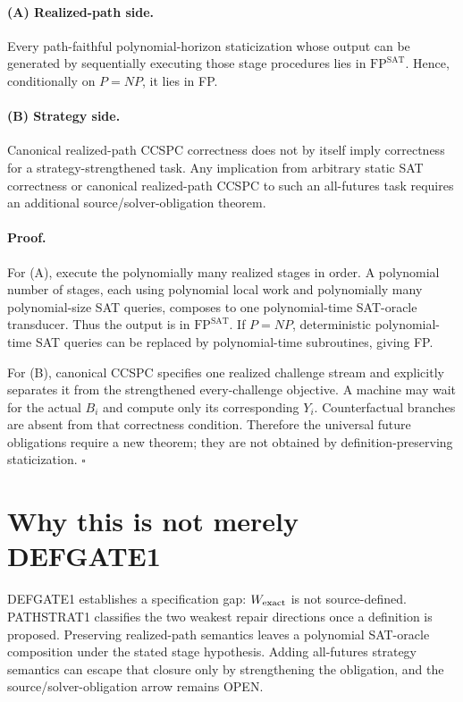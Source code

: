 \documentclass[11pt]{article}
\begin{document}
\paragraph{(A) Realized-path side.}
Every path-faithful polynomial-horizon staticization whose output can be generated by sequentially executing those stage procedures lies in $\mathrm{FP}^{\mathrm{SAT}}$. Hence, conditionally on $P=NP$, it lies in FP.

\paragraph{(B) Strategy side.}
Canonical realized-path CCSPC correctness does not by itself imply correctness for a strategy-strengthened task. Any implication from arbitrary static SAT correctness or canonical realized-path CCSPC to such an all-futures task requires an additional source/solver-obligation theorem.

\paragraph{Proof.}
For (A), execute the polynomially many realized stages in order. A polynomial number of stages, each using polynomial local work and polynomially many polynomial-size SAT queries, composes to one polynomial-time SAT-oracle transducer. Thus the output is in $\mathrm{FP}^{\mathrm{SAT}}$. If $P=NP$, deterministic polynomial-time SAT queries can be replaced by polynomial-time subroutines, giving FP.

For (B), canonical CCSPC specifies one realized challenge stream and explicitly separates it from the strengthened every-challenge objective. A machine may wait for the actual $B_i$ and compute only its corresponding $Y_i$. Counterfactual branches are absent from that correctness condition. Therefore the universal future obligations require a new theorem; they are not obtained by definition-preserving staticization. \(\square\)

\section*{Why this is not merely DEFGATE1}
DEFGATE1 establishes a specification gap: $W_{\rm exact}$ is not source-defined. PATHSTRAT1 classifies the two weakest repair directions once a definition is proposed. Preserving realized-path semantics leaves a polynomial SAT-oracle composition under the stated stage hypothesis. Adding all-futures strategy semantics can escape that closure only by strengthening the obligation, and the source/solver-obligation arrow remains OPEN.
\end{document}
